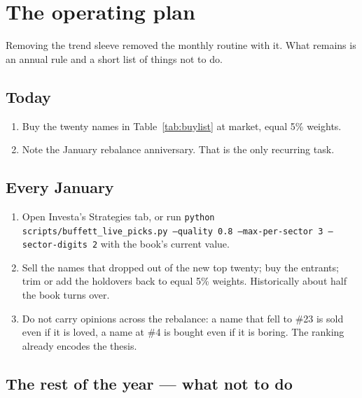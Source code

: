 \documentclass[11pt,a4paper]{article}
\begin{document}
\section{The operating plan}\label{sec:plan}

Removing the trend sleeve removed the monthly routine with it. What remains is
an annual rule and a short list of things not to do.

\subsection{Today}

\begin{enumerate}[leftmargin=1.6em,itemsep=0.25em]
  \item Buy the twenty names in Table~\ref{tab:buylist} at market, equal 5\%
  weights.
  \item Note the January rebalance anniversary. That is the only recurring task.
\end{enumerate}

\subsection{Every January}

\begin{enumerate}[leftmargin=1.6em,itemsep=0.25em]
  \item Open Investa's \textsf{Strategies} tab, or run
  \texttt{python scripts/buffett\_live\_picks.py --quality 0.8
  --max-per-sector 3 --sector-digits 2} with the book's current value.
  \item Sell the names that dropped out of the new top twenty; buy the
  entrants; trim or add the holdovers back to equal 5\% weights. Historically
  about half the book turns over.
  \item Do not carry opinions across the rebalance: a name that fell to \#23 is
  sold even if it is loved, a name at \#4 is bought even if it is boring. The
  ranking already encodes the thesis.
\end{enumerate}

\subsection{The rest of the year --- what not to do}
\end{document}
